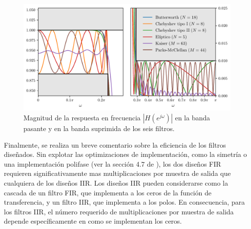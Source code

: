 \documentclass[a4paper]{report}
\begin{document}
\begin{figure}[!htb]
 \begin{center}
 \includegraphics[width=1\textwidth]{figuras/filter_design_upsampling_filter_sec_07_10_zoom.pdf}
 \caption{\label{fig:filter_design_upsampling_filter_sec_07_10_zoom} Magnitud de la respuesta en frecuencia \(|H(e^{j\omega})|\) en la banda pasante y en la banda suprimida de los seis filtros.}
 \end{center}
\end{figure}

Finalmente, se realiza un breve comentario sobre la eficiencia de los filtros diseñados. Sin explotar las optimizaciones de implementación, como la simetría o una implementación polifase (ver la sección 4.7 de \cite{oppenheim2009discrete}), los dos diseños FIR requieren significativamente mas multiplicaciones por muestra de salida que cualquiera de los diseños IIR. Los diseños IIR pueden considerarse como la cascada de un filtro FIR, que implementa a los ceros de la función de transferencia, y un filtro IIR, que implementa a los polos. En consecuencia, para los filtros IIR, el número requerido de multiplicaciones por muestra de salida depende específicamente en como se implementan los ceros.
\end{document}
